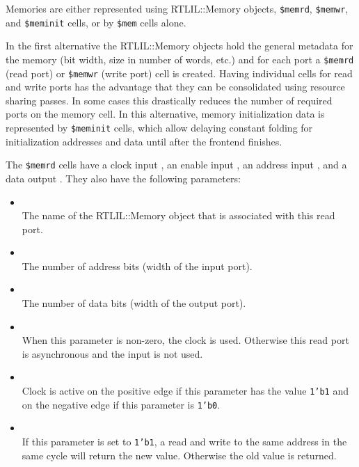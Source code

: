 Memories are either represented using RTLIL::Memory objects, {\tt \$memrd}, {\tt \$memwr}, and {\tt \$meminit}
cells, or by {\tt \$mem} cells alone.

In the first alternative the RTLIL::Memory objects hold the general metadata for the memory (bit width,
size in number of words, etc.) and for each port a {\tt \$memrd} (read port) or {\tt \$memwr} (write port)
cell is created. Having individual cells for read and write ports has the advantage that they can be
consolidated using resource sharing passes. In some cases this drastically reduces the number of required
ports on the memory cell. In this alternative, memory initialization data is represented by {\tt \$meminit} cells,
which allow delaying constant folding for initialization addresses and data until after the frontend finishes.

The {\tt \$memrd} cells have a clock input , an enable input , an
address input , and a data output . They also have the
following parameters:

\begin{itemize}
\item {} \\
The name of the RTLIL::Memory object that is associated with this read port.

\item {} \\
The number of address bits (width of the  input port).

\item {} \\
The number of data bits (width of the  output port).

\item {} \\
When this parameter is non-zero, the clock is used. Otherwise this read port is asynchronous and
the  input is not used.

\item {} \\
Clock is active on the positive edge if this parameter has the value {\tt 1'b1} and on the negative
edge if this parameter is {\tt 1'b0}.

\item {} \\
If this parameter is set to {\tt 1'b1}, a read and write to the same address in the same cycle will
return the new value. Otherwise the old value is returned.
\end{itemize}

